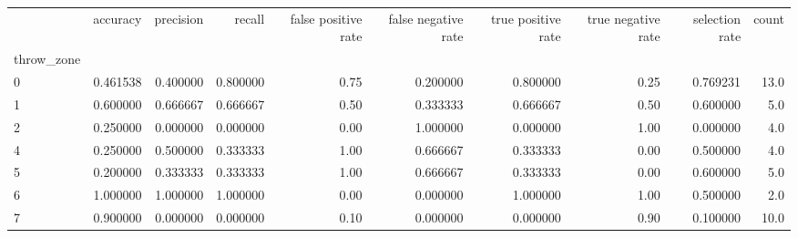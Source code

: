 \begin{tabular}{lrrrrrrrrr}
\toprule
{} &  accuracy &  precision &    recall &  false positive rate &  false negative rate &  true positive rate &  true negative rate &  selection rate &  count \\
throw\_zone &           &            &           &                      &                      &                     &                     &                 &        \\
\midrule
0          &  0.461538 &   0.400000 &  0.800000 &                 0.75 &             0.200000 &            0.800000 &                0.25 &        0.769231 &   13.0 \\
1          &  0.600000 &   0.666667 &  0.666667 &                 0.50 &             0.333333 &            0.666667 &                0.50 &        0.600000 &    5.0 \\
2          &  0.250000 &   0.000000 &  0.000000 &                 0.00 &             1.000000 &            0.000000 &                1.00 &        0.000000 &    4.0 \\
4          &  0.250000 &   0.500000 &  0.333333 &                 1.00 &             0.666667 &            0.333333 &                0.00 &        0.500000 &    4.0 \\
5          &  0.200000 &   0.333333 &  0.333333 &                 1.00 &             0.666667 &            0.333333 &                0.00 &        0.600000 &    5.0 \\
6          &  1.000000 &   1.000000 &  1.000000 &                 0.00 &             0.000000 &            1.000000 &                1.00 &        0.500000 &    2.0 \\
7          &  0.900000 &   0.000000 &  0.000000 &                 0.10 &             0.000000 &            0.000000 &                0.90 &        0.100000 &   10.0 \\
\bottomrule
\end{tabular}
